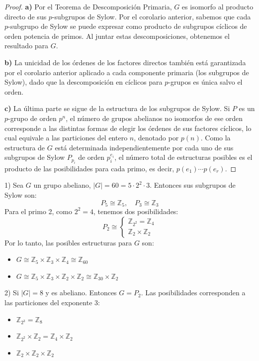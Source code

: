 \begin{proof}
\textbf{a)} Por el Teorema de Descomposición Primaria, $G$ es isomorfo al producto directo de sus $p$-subgrupos de Sylow. Por el corolario anterior, sabemos que cada $p$-subgrupo de Sylow se puede expresar como producto de subgrupos cíclicos de orden potencia de primos. Al juntar estas descomposiciones, obtenemos el resultado para $G$.

\textbf{b)} La unicidad de los órdenes de los factores directos también está garantizada por el corolario anterior aplicado a cada componente primaria (los subgrupos de Sylow), dado que la descomposición en cíclicos para $p$-grupos es única salvo el orden.

\textbf{c)} La última parte se sigue de la estructura de los subgrupos de Sylow. Si $P$ es un $p$-grupo de orden $p^n$, el número de grupos abelianos no isomorfos de ese orden corresponde a las distintas formas de elegir los órdenes de sus factores cíclicos, lo cual equivale a las particiones del entero $n$, denotado por $p(n)$.
Como la estructura de $G$ está determinada independientemente por cada uno de sus subgrupos de Sylow $P_{p_i}$ de orden $p_i^{e_i}$, el número total de estructuras posibles es el producto de las posibilidades para cada primo, es decir, $p(e_1) \cdots p(e_r)$.
\end{proof}

\begin{eje}
1) Sea $G$ un grupo abeliano, $|G| = 60 = 5 \cdot 2^2 \cdot 3$.
Entonces sus subgrupos de Sylow son:
\begin{equation*}
P_5 \cong \mathbb{Z}_5, \quad P_3 \cong \mathbb{Z}_3
\end{equation*}
Para el primo 2, como $2^2=4$, tenemos dos posibilidades:
\begin{equation*}
P_2 \cong \begin{cases} \mathbb{Z}_{2^2} = \mathbb{Z}_4 \\ \mathbb{Z}_2 \times \mathbb{Z}_2 \end{cases}
\end{equation*}
Por lo tanto, las posibles estructuras para $G$ son:
\begin{itemize}
    \item $G \cong \mathbb{Z}_5 \times \mathbb{Z}_3 \times \mathbb{Z}_4 \cong \mathbb{Z}_{60}$
    \item $G \cong \mathbb{Z}_5 \times \mathbb{Z}_3 \times \mathbb{Z}_2 \times \mathbb{Z}_2 \cong \mathbb{Z}_{30} \times \mathbb{Z}_2$
\end{itemize}

2) Si $|G|=8$ y es abeliano. Entonces $G = P_2$.
Las posibilidades corresponden a las particiones del exponente 3:
\begin{itemize}
    \item $\mathbb{Z}_{2^3} = \mathbb{Z}_8$
    \item $\mathbb{Z}_{2^2} \times \mathbb{Z}_2 = \mathbb{Z}_4 \times \mathbb{Z}_2$
    \item $\mathbb{Z}_2 \times \mathbb{Z}_2 \times \mathbb{Z}_2$
\end{itemize}
\end{eje}

